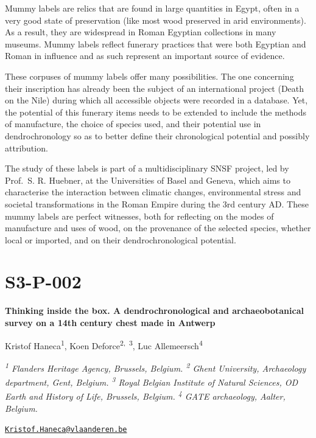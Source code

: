 \documentclass[
]{book}
\begin{document}
Mummy labels are relics that are found in large quantities in Egypt, often in a very good state of preservation (like most wood preserved in arid environments). As a result, they are widespread in Roman Egyptian collections in many museums. Mummy labels reflect funerary practices that were both Egyptian and Roman in influence and as such represent an important source of evidence.

These corpuses of mummy labels offer many possibilities. The one concerning their inscription has already been the subject of an international project (Death on the Nile) during which all accessible objects were recorded in a database. Yet, the potential of this funerary items needs to be extended to include the methods of manufacture, the choice of species used, and their potential use in dendrochronology so as to better define their chronological potential and possibly attribution.

The study of these labels is part of a multidisciplinary SNSF project, led by Prof.~S. R. Huebner, at the Universities of Basel and Geneva, which aims to characterise the interaction between climatic changes, environmental stress and societal transformations in the Roman Empire during the 3rd century AD. These mummy labels are perfect witnesses, both for reflecting on the modes of manufacture and uses of wood, on the provenance of the selected species, whether local or imported, and on their dendrochronological potential.

\hypertarget{s3-p-002}{%
\section*{S3-P-002}\label{s3-p-002}}

\textbf{Thinking inside the box. A dendrochronological and archaeobotanical survey on a 14th century chest made in Antwerp}

Kristof Haneca\textsuperscript{1}, Koen Deforce\textsuperscript{2,~3}, Luc Allemeersch\textsuperscript{4}

\emph{\textsuperscript{1} Flanders Heritage Agency, Brussels, Belgium. \textsuperscript{2} Ghent University, Archaeology department, Gent, Belgium. \textsuperscript{3} Royal Belgian Institute of Natural Sciences, OD Earth and History of Life, Brussels, Belgium. \textsuperscript{4} GATE archaeology, Aalter, Belgium.}

\href{mailto:Kristof.Haneca@vlaanderen.be}{\nolinkurl{Kristof.Haneca@vlaanderen.be}}
\end{document}
